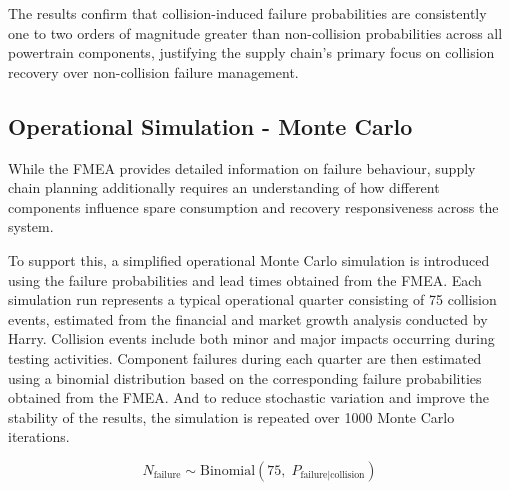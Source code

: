 \documentclass[11pt, a4paper]{report}
\numberwithin{equation}{section}
\begin{document}
\begin{refsection}
\begin{table}[H]
\begin{tabularx}{\textwidth}{
l
X
p{}
X
p{}
}
\bottomrule
\end{tabularx}
\end{table}

The results confirm that collision-induced failure probabilities are consistently one to two orders of magnitude greater than non-collision probabilities across all powertrain components, justifying the supply chain's primary focus on collision recovery over non-collision failure management.

\subsection{Operational Simulation - Monte Carlo}

While the FMEA provides detailed information on failure behaviour, supply chain planning additionally requires an understanding of how different components influence spare consumption and recovery responsiveness across the system.

To support this, a simplified operational Monte Carlo simulation is introduced using the failure probabilities and lead times obtained from the FMEA\cite{montecarlo}. Each simulation run represents a typical operational quarter consisting of 75 collision events, estimated from the financial and market growth analysis conducted by Harry. Collision events include both minor and major impacts occurring during testing activities. Component failures during each quarter are then estimated using a binomial distribution based on the corresponding failure probabilities obtained from the FMEA. And to reduce stochastic variation and improve the stability of the results, the simulation is repeated over 1000 Monte Carlo iterations.

\[
N_{\text{failure}} \sim \text{Binomial}(75,\; P_{\text{failure} \mid \text{collision}})
\]

\begin{table}[h]
\centering
\caption{Monte Carlo-based spare planning results for powertrain components over a typical operational quarter.}
\label{tab:inventory_policy}
\renewcommand{\arraystretch}{1.3}

\end{table}
\end{refsection}
\end{document}
